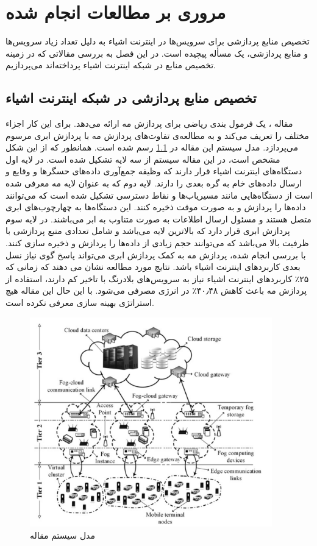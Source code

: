 \chapter{مروری بر مطالعات انجام شده}\label{chap:literature_review}
  \thispagestyle{empty}
  تخصیص منابع پردازشی برای سرویس‌ها در اینترنت اشیاء به دلیل تعداد زیاد سرویس‌ها و منابع پردازشی، یک مسأله پیچیده است.
  در این فصل به بررسی مقالاتی که در زمینه تخصیص منابع در شبکه اینترنت اشیاء پرداخته‌اند می‌پردازیم.

  \section{تخصیص منابع پردازشی در شبکه اینترنت اشیاء}
    مقاله \cite{sarkar2016theoretical}، یک فرمول بندی ریاضی برای پردازش مه ارائه می‌دهد.
    برای این کار اجزاء مختلف را تعریف می‌کند و به مطالعه‌ی تفاوت‌های پردازش مه با پردازش ابری مرسوم می‌پردازد.
    مدل سیستم این مقاله در \cref{fig:chapter_2:system_model_sarkar2016theoretical} رسم شده است.
    همانطور که از این شکل مشخص است، در این مقاله سیستم از سه لایه تشکیل شده است.
    در لایه اول دستگاه‌های اینترنت اشیاء قرار دارند که وظیفه جمع‌آوری داده‌های حسگر‌ها و وقایع و ارسال داده‌های خام به گره بعدی را دارند.
    لایه دوم که به عنوان لایه مه معرفی شده است از دستگاه‌هایی مانند مسیریاب‌ها و نقاط دسترسی تشکیل شده است که می‌توانند داده‌ها را پردازش و به صورت موقت ذخیره کنند.
    این دستگاه‌ها به چهارچوب‌های ابری متصل هستند و مسئول ارسال اطلاعات به صورت متناوب به ابر می‌باشند.
    در لایه سوم پردازش ابری قرار دارد که بالاترین لایه می‌باشد و شامل تعدادی منبع پردازشی با ظرفیت بالا می‌باشد که می‌توانند حجم زیادی از داده‌‌ها را پردازش و ذخیره سازی کنند.
    با بررسی انجام شده، پردازش مه به کمک پردازش ابری می‌تواند پاسخ گوی نیاز نسل بعدی کاربرد‌های اینترنت اشیاء باشد.
    نتایج مورد مطالعه نشان می دهند که زمانی که ۲۵٪ کاربرد‌های اینترنت اشیاء نیاز به سرویس‌های بلادرنگ با تاخیر کم دارند، استفاده از پردازش مه باعث کاهش ۴۰٫۴۸٪ در انرژی مصرفی می‌شود.
    با این حال این مقاله هیچ استراتژی بهینه سازی معرفی نکرده است.

    \begin{figure}[h]
      \centerline{\includegraphics[width=10.5cm]{graphics/chapter_2/system_model_sarkar2016theoretical}}
      \caption{مدل سیستم مقاله \cite{sarkar2016theoretical}}
      \label{fig:chapter_2:system_model_sarkar2016theoretical}
    \end{figure}

